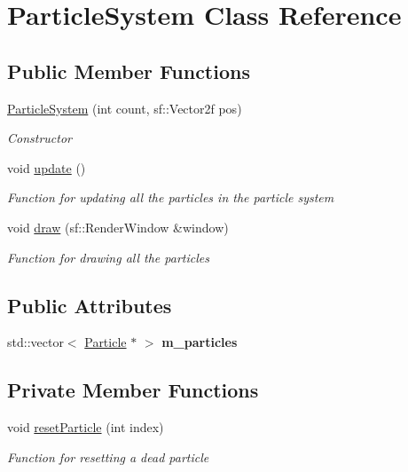 \hypertarget{class_particle_system}{}\section{Particle\+System Class Reference}
\label{class_particle_system}
\subsection*{Public Member Functions}
\begin{DoxyCompactItemize}
\item 
\mbox{\hyperlink{class_particle_system_a5b2793951c242cf0991ed50b9824041f}{Particle\+System}} (int count, sf\+::\+Vector2f pos)
\begin{DoxyCompactList}\small\item\em Constructor \end{DoxyCompactList}\item 
void \mbox{\hyperlink{class_particle_system_a40e5ab5f279f0a0ec6b7b2812543d899}{update}} ()
\begin{DoxyCompactList}\small\item\em Function for updating all the particles in the particle system \end{DoxyCompactList}\item 
void \mbox{\hyperlink{class_particle_system_abfd6c818710949c3dd4f5dc891f62edc}{draw}} (sf\+::\+Render\+Window \&window)
\begin{DoxyCompactList}\small\item\em Function for drawing all the particles \end{DoxyCompactList}\end{DoxyCompactItemize}
\subsection*{Public Attributes}
\begin{DoxyCompactItemize}
\item 
\mbox{\label{class_particle_system_a0fda75362b3997f52f1fcd94ef4c33f8}} 
std\+::vector$<$ \mbox{\hyperlink{class_particle}{Particle}} $\ast$ $>$ {\bfseries m\+\_\+particles}
\end{DoxyCompactItemize}
\subsection*{Private Member Functions}
\begin{DoxyCompactItemize}
\item 
void \mbox{\hyperlink{class_particle_system_aa85c923212223e420dce6afb11a31cc6}{reset\+Particle}} (int index)
\begin{DoxyCompactList}\small\item\em Function for resetting a dead particle \end{DoxyCompactList}\end{DoxyCompactItemize}
